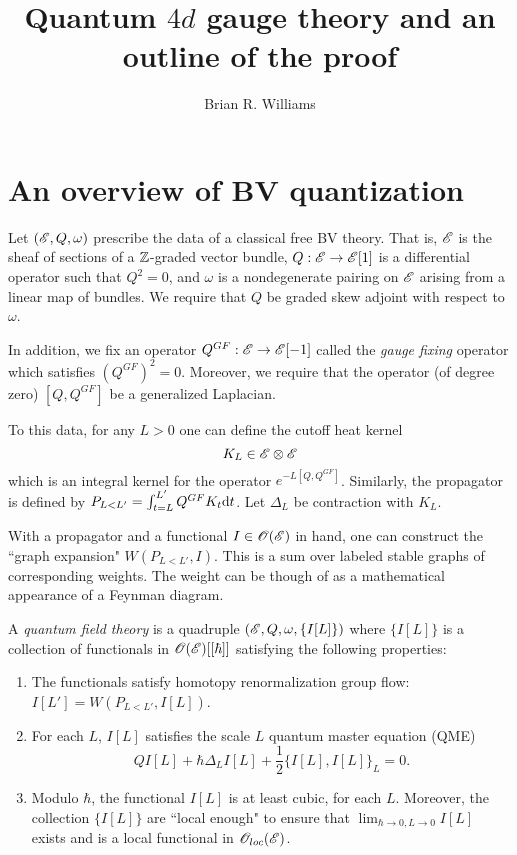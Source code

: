 \documentclass[11pt]{amsart}
\title{Quantum $4d$ gauge theory and an outline of the proof}
\author{Brian R. Williams}
\date{}
\begin{document}
\maketitle
 
\section{An overview of BV quantization}

Let $(\mathscr E, Q, \omega)$ prescribe the data of a classical free BV theory. 
That is, $\mathscr E$ is the sheaf of sections of a $\mathbb Z$-graded vector bundle, $Q : \mathscr E \to \mathscr E[1]$ is a differential operator such that $Q^2 = 0$, and $\omega$ is a nondegenerate pairing on $\mathscr E$ arising from a linear map of bundles. 
We require that $Q$ be graded skew adjoint with respect to $\omega$. 

In addition, we fix an operator $Q^{GF} : \mathscr E \to \mathscr E[-1]$ called the {\em gauge fixing} operator which satisfies $(Q^{GF})^2 = 0$.
Moreover, we require that the operator (of degree zero) $[Q,Q^{GF}]$ be a generalized Laplacian. 

To this data, for any $L > 0$ one can define the cutoff heat kernel 
\[
K_L \in \mathscr E \otimes \mathscr E
\]
which is an integral kernel for the operator $e^{-L[Q,Q^{GF}]}$. 
Similarly, the propagator is defined by $P_{L < L'} = \int_{t=L}^{L'} Q^{GF} K_t {\rm d} t$. 
Let $\Delta_L$ be contraction with $K_L$. 

With a propagator and a functional $I \in \mathscr O(\mathscr E)$ in hand, one can construct the ``graph expansion" $W(P_{L < L'}, I)$.
This is a sum over labeled stable graphs of corresponding weights. 
The weight can be though of as a mathematical appearance of a Feynman diagram. 

\begin{dfn}[\cite{CG2}]
A {\em quantum field theory} is a quadruple $(\mathscr E, Q, \omega, \{I[L]\})$ where $\{I[L]\}$ is a collection of functionals in $\mathscr O(\mathscr E)[[\hbar]]$ satisfying the following properties:
\begin{enumerate}
\item The functionals satisfy homotopy renormalization group flow: $I [L'] = W(P_{L<L'} , I[L])$. 
\item For each $L$, $I[L]$ satisfies the scale $L$ quantum master equation (QME)
\[
Q I[L] + \hbar \Delta_L I[L] + \frac{1}{2} \{I[L], I[L]\}_L = 0 .
\]
\item Modulo $\hbar$, the functional $I[L]$ is at least cubic, for each $L$. 
Moreover, the collection $\{I[L]\}$ are ``local enough" to ensure that $\lim_{\hbar \to 0, L \to 0} I[L]$ exists and is a local functional in $\mathscr O_{loc}(\mathscr E)$. 
\end{enumerate}
\end{dfn}
\end{document}
